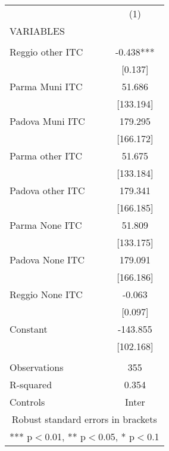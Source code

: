 \begin{tabular}{lc} \hline
 & (1) \\
VARIABLES &  \\ \hline
 &  \\
Reggio other ITC & -0.438*** \\
 & [0.137] \\
Parma Muni ITC & 51.686 \\
 & [133.194] \\
Padova Muni ITC & 179.295 \\
 & [166.172] \\
Parma other ITC & 51.675 \\
 & [133.184] \\
Padova other ITC & 179.341 \\
 & [166.185] \\
Parma None ITC & 51.809 \\
 & [133.175] \\
Padova None ITC & 179.091 \\
 & [166.186] \\
Reggio None ITC & -0.063 \\
 & [0.097] \\
Constant & -143.855 \\
 & [102.168] \\
 &  \\
Observations & 355 \\
R-squared & 0.354 \\
 Controls & Inter \\ \hline
\multicolumn{2}{c}{ Robust standard errors in brackets} \\
\multicolumn{2}{c}{ *** p$<$0.01, ** p$<$0.05, * p$<$0.1} \\
\end{tabular}
